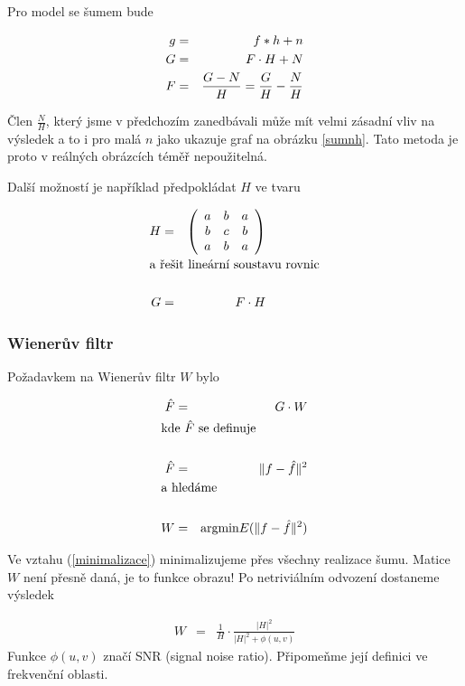 
Pro model se šumem bude

\begin{eqnarray}
g&=&f \ast h+n\label{eqv4}\\
G&=&F\cdot H+N\label{eqv5}\\
F&=&\frac{G-N}{H}=\frac{G}{H}-\frac{N}{H}\label{eqv6}
\end{eqnarray}

Člen $\frac{N}{H}$, který jsme v předchozím zanedbávali může mít velmi zásadní vliv na výsledek a to i pro malá $n$ jako
ukazuje graf na obrázku \ref{sumnh}. Tato metoda je proto v reálných obrázcích téměř nepoužitelná.

Další možností je například předpokládat $H$ ve tvaru 


\begin{eqnarray}
H&=&\left(\begin{array}{ccc}a&b&a\\b&c&b\\a&b&a\end{array}\right)\\
\noalign{\hbox{a řešit lineární soustavu rovnic}\nonumber}\\
G&=&F\cdot H
\end{eqnarray}

\subsubsection{Wienerův filtr}
Požadavkem na Wienerův filtr $W$ bylo 

\begin{eqnarray}
\hat{F}&=&G\cdot W\\
\noalign{\hbox{kde $\hat{F}$ se definuje}\nonumber}\\
\hat{F}&=&\|f-\hat{f}\|^2\\
\noalign{\hbox{a hledáme}\nonumber}\\
W&=&\mathrm{argmin}E(\|f-\hat{f}\|^2)\label{minimalizace}
\end{eqnarray}

Ve vztahu (\ref{minimalizace}) minimalizujeme přes všechny realizace šumu. Matice $W$ není přesně daná, je to funkce obrazu!
Po netriviálním odvození dostaneme výsledek

\begin{eqnarray}
W&=&\frac{1}{H}\cdot\frac{|H|^2}{|H|^2+\phi(u,v)}
\end{eqnarray}
Funkce $\phi(u,v)$ značí SNR (signal noise ratio). Připomeňme její definici ve frekvenční oblasti.


